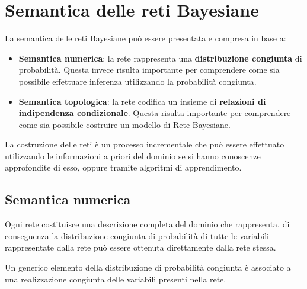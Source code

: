 \section{Semantica delle reti Bayesiane}
La semantica delle reti Bayesiane può essere presentata e compresa in base a:
\begin{itemize}
    \item \textbf{Semantica numerica}: la rete rappresenta una \textbf{distribuzione
              congiunta} di probabilità. Questa invece risulta importante per
          comprendere come sia possibile effettuare inferenza utilizzando la
          probabilità congiunta.
    \item \textbf{Semantica topologica}: la rete codifica un insieme di
          \textbf{relazioni di indipendenza condizionale}. Questa risulta
          importante per comprendere come sia possibile costruire un modello di
          Rete Bayesiane.
\end{itemize}
La costruzione delle reti è un processo incrementale che può essere effettuato
utilizzando le informazioni a priori del dominio se si hanno conoscenze
approfondite di esso, oppure tramite algoritmi di apprendimento.
\subsection{Semantica numerica}
Ogni rete costituisce una descrizione completa del dominio che rappresenta, di
conseguenza la distribuzione congiunta di probabilità di tutte le variabili
rappresentate dalla rete può essere ottenuta direttamente dalla rete stessa.

Un generico elemento della distribuzione di probabilità congiunta è associato a
una realizzazione congiunta delle variabili presenti nella rete.

